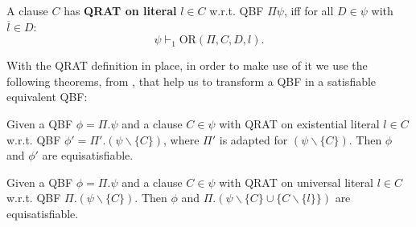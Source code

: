 \begin{definition}
    A clause $C$ has \textbf{QRAT on literal} $l \in C$ w.r.t. QBF $\Pi\psi$, iff for all $D \in \psi$ with $\overline{l} \in D$:
    \[ \psi \vdash_1 \text{OR}(\Pi, C, D, l). \]
\end{definition}

\begin{example}
\end{example}

With the QRAT definition in place, in order to make use of it we use the following theorems, from \cite{qrat}, that help us to transform a QBF in a satisfiable equivalent QBF:

\begin{theorem}
    Given a QBF $\phi = \Pi.\psi$ and a clause $C \in \psi$ with QRAT on existential literal $l \in C$ w.r.t. QBF $\phi' = \Pi'.(\psi \backslash \{C\})$, where $\Pi'$ is adapted for $(\psi \backslash \{C\})$. Then $\phi$ and $\phi'$ are equisatisfiable. 
\end{theorem}

\begin{theorem}
    Given a QBF $\phi = \Pi.\psi$ and a clause $C \in \psi$ with QRAT on universal literal $l \in C$ w.r.t. QBF $\Pi.(\psi \backslash \{C\})$. Then $\phi$ and $\Pi.(\psi \backslash \{C\} \cup \{C \backslash \{l\}\})$ are equisatisfiable. 
\end{theorem}



